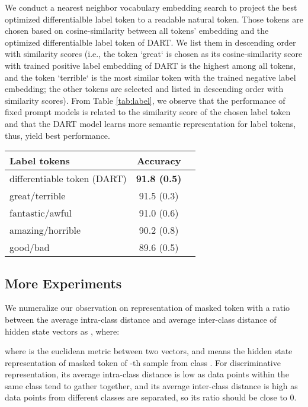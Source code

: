 \documentclass{article} \usepackage{iclr2022_conference,times}
\begin{document}
{We conduct a nearest neighbor vocabulary embedding search to project the best optimized differentialble label token to a readable natural token.
Those tokens are chosen based on cosine-similarity between all tokens' embedding and the optimized differentialble label token of DART. 
We list them in descending order with similarity scores (i.e., the token `great` is chosen as its cosine-similarity score with trained positive label embedding of DART is the highest among all tokens, and the token `terrible` is the most similar token with the trained negative label embedding; the other tokens are selected and listed in descending order with similarity scores). 
From Table \ref{tab:label}, we observe that the performance of fixed prompt models is related to the similarity score of the chosen label token and that the DART model learns more semantic representation for label tokens, thus, yield best performance.

\begin{table*}[htb]
\begin{center}
\centering
\begin{tabular}{l c c}
\toprule
 \textbf{Label tokens} & \textbf{Accuracy} \\
\midrule
 differentiable token (DART) & \textbf{91.8 (0.5)} \\
 great/terrible & 91.5 (0.3) \\
 fantastic/awful & 91.0 (0.6) \\
 amazing/horrible & 90.2 (0.8) \\
 good/bad & 89.6 (0.5) \\
\bottomrule
\end{tabular}
\end{center}
\caption{Few-shot performance on CR task using constrained label tokens with DART.
}
\vspace{-15pt}
    \label{tab:label}
\end{table*}

 }
 
 
 
 
\subsection{More Experiments}
\label{exp_appendx}
We numeralize our observation on representation of masked token with a ratio between the average intra-class distance and average inter-class distance of hidden state vectors as , where:

where  is the euclidean metric between two vectors, and  means the hidden state representation of masked token of -th sample from class .
For discriminative representation, its average intra-class distance is low as data points within the same class tend to gather together, and its average inter-class distance is high as data points from different classes are separated, so its  ratio should be close to 0.
\end{document}
